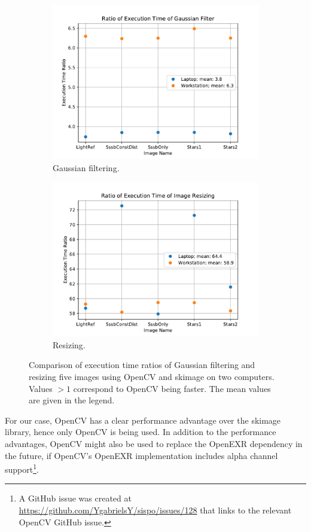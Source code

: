\begin{figure}[htb]
    \centering
    \begin{subfigure}[b]{0.47\textwidth}
        \centering
        \includegraphics[width=\textwidth]{doc/thesis/0_figures/cv_skimage/Comparison_Gaussian}
        \caption{Gaussian filtering.}
        \label{fig:bm_comparison_gauss}
    \end{subfigure}
    \begin{subfigure}[b]{0.47\textwidth}
        \centering
        \includegraphics[width=\textwidth]{doc/thesis/0_figures/cv_skimage/Comparison_Resize}
        \caption{Resizing.}
        \label{fig:bm_comparison_res}
    \end{subfigure}
    \caption{Comparison of execution time ratios of Gaussian filtering and resizing five images using OpenCV and \gls{skimage} on two computers. Values $> 1$ correspond to OpenCV being faster. The mean values are given in the legend.}
    \label{fig:bm_comparison}
\end{figure}

For our case, OpenCV has a clear performance advantage over the \gls{skimage} library, hence only OpenCV is being used. In addition to the performance advantages, OpenCV might also be used to replace the OpenEXR dependency in the future, if OpenCV's OpenEXR implementation includes alpha channel support\footnote{A GitHub issue was created at \url{https://github.com/YgabrielsY/sispo/issues/128} that links to the relevant OpenCV GitHub issue.}.